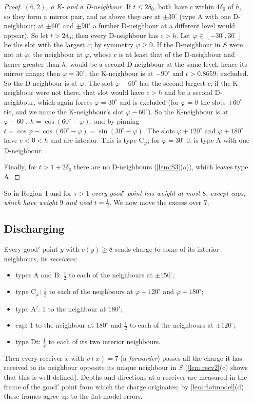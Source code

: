 \documentclass[11pt]{amsart}
\theoremstyle{definition}
\theoremstyle{remark}
\begin{document}
\begin{proof}
\emph{$(6,2)$, a K- and a D-neighbour.} If $t\le2\delta_0$, both have $c$ within $4\delta_0$ of $h$, so they form a mirror pair, and as above they are at $\pm30^\circ$ (type A with one D-neighbour; at $\pm60^\circ$ and $\pm90^\circ$ a further D-neighbour at a different level would appear). So let $t>2\delta_0$; then every D-neighbour has $c>h$. Let $\varphi\in[-30^\circ,30^\circ]$ be the slot with the largest $c$; by symmetry $\varphi\ge0$. If the D-neighbour in $S$ were not at $\varphi$, the neighbour at $\varphi$, whose $c$ is at least that of the D-neighbour and hence greater than $h$, would be a second D-neighbour at the same level, hence its mirror image; then $\varphi=30^\circ$, the K-neighbour is at $-90^\circ$ and $t>0.8659$; excluded. So the D-neighbour is at $\varphi$. The slot $\varphi-60^\circ$ has the second largest $c$; if the K-neighbour were not there, that slot would have $c>h$ and be a second D-neighbour, which again forces $\varphi=30^\circ$ and is excluded (for $\varphi=0$ the slots $\pm60^\circ$ tie, and we name the K-neighbour's slot $\varphi-60^\circ$). So the K-neighbour is at $\varphi-60^\circ$, $h=\cos(60^\circ-\varphi)$, and by pinning $t=\cos\varphi-\cos(60^\circ-\varphi)=\sin(30^\circ-\varphi)$. The slots $\varphi+120^\circ$ and $\varphi+180^\circ$ have $c<0<h$ and are interior. This is type C$_\varphi$; for $\varphi=30^\circ$ it is type A with one D-neighbour.

Finally, for $t>1+2\delta_0$ there are no D-neighbours (\cref{lem:S3}(a)), which leaves type A.
\end{proof}

So in Region~I and for $\tau>1$ \emph{every good$'$ point has weight at most $8$, except caps, which have weight $9$ and need $t=\frac12$}. We now move the excess over $7$.

\subsection{Discharging}
Every good$'$ point $y$ with $v(y)\ge8$ sends charge to some of its interior neighbours, its \emph{receivers}:
\begin{itemize}[leftmargin=2em]
\item types A and B: $\frac12$ to each of the neighbours at $\pm150^\circ$;
\item type C$_\varphi$: $\frac12$ to each of the neighbours at $\varphi+120^\circ$ and $\varphi+180^\circ$;
\item type A$'$: $1$ to the neighbour at $180^\circ$;
\item cap: $1$ to the neighbour at $180^\circ$ and $\frac12$ to each of the neighbours at $\pm120^\circ$;
\item type Dt: $\frac12$ to each of its two interior neighbours.
\end{itemize}
Then every receiver $x$ with $v(x)=7$ (a \emph{forwarder}) passes all the charge it has received to its neighbour opposite its unique neighbour in $S$ (\cref{lem:recv2}(c) shows that this is well defined). Depths and directions at a receiver are measured in the frame of the good$'$ point from which the charge originates; by \cref{lem:flatmodel}(d) these frames agree up to the flat-model errors.
\end{document}

